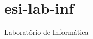 \chapter{esi-\/lab-\/inf}
\hypertarget{md_README}{}\label{md_README}
\label{md_README_autotoc_md0}%
%


Laboratório de Informática 